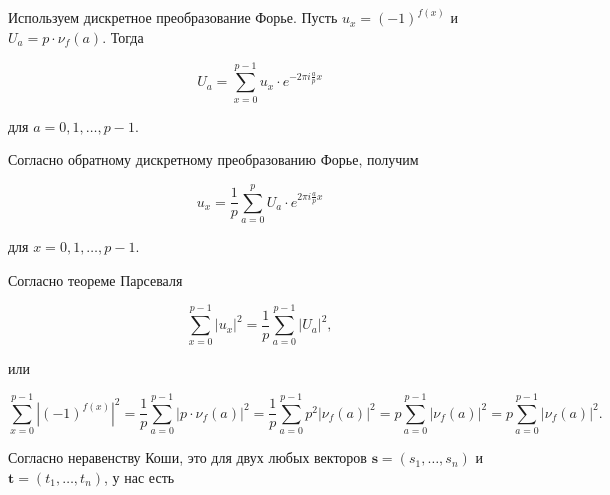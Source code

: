 \documentclass{article}
\newcommand{\ZZ}{\mathbb{Z}}
\begin{document}





Используем дискретное преобразование Форье. Пусть $u_x = (-1)^{f(x)}$ и $U_a = p \cdot \nu_f(a)$. Тогда

\begin{equation*}
    U_a = \sum_{x = 0}^{p-1} u_x \cdot e^{-2\pi i \frac{a}{p} x}
\end{equation*}

для $a = 0, 1, \ldots, p - 1$.

Согласно обратному дискретному преобразованию Форье, получим

\begin{equation*}
    u_x = \frac{1}{p} \sum_{a = 0}^{p} U_a \cdot e^{2\pi i \frac{a}{p} x}
\end{equation*}

для $x = 0, 1, \ldots, p - 1$.

Согласно теореме Парсеваля

\begin{equation*}
    \sum_{x = 0}^{p - 1} \lvert u_x \rvert^2 = \frac{1}{p} \sum_{a = 0}^{p - 1} \lvert U_a \rvert^2,
\end{equation*}

или

\begin{equation*}
    \sum_{x = 0}^{p - 1} \left|(-1)^{f(x)}\right|^2 = \frac{1}{p} \sum_{a=0}^{p-1} \left|p \cdot \nu_f(a)\right|^2 = \frac{1}{p} \sum_{a = 0}^{p - 1} p^2 \left|\nu_f(a)\right|^2 = p \sum_{a = 0}^{p - 1} \left|\nu_f(a)\right|^2 = p \sum_{a = 0}^{p - 1} \lvert \nu_f(a) \rvert^2.
\end{equation*}

Согласно неравенству Коши, это для двух любых векторов $\bm{s} = (s_1, \ldots, s_n)$ и $\bm{t} = (t_1, \ldots, t_n)$, у нас есть
\end{document}
